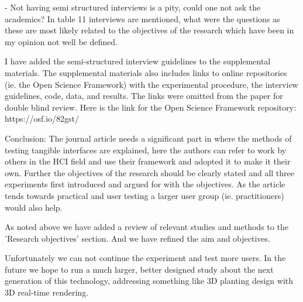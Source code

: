 - Not having semi structured interviews is a pity, could one not ask the academics? In table 11 interviews are mentioned, what were the questions as these are most likely related to the objectives of the research which have been in my opinion not well be defined.

I have added the semi-structured interview guidelines to the supplemental materials. The supplemental materials also includes links to online repositories (ie. the Open Science Framework) with the experimental procedure, the interview guidelines, code, data, and results. The links were omitted from the paper for double blind review. Here is the link for the Open Science Framework repository: https://osf.io/82gst/

Conclusion:
The journal article needs a significant part in where the methods of testing tangible interfaces are explained, here the authors can refer to work by others in the HCI field and use their framework and adopted it to make it their own. Further the objectives of the research should be clearly stated and all three experiments first introduced and argued for with the objectives. As the article tends towards practical and user testing a larger user group (ie. practitioners) would also help.

As noted above we have added a review of relevant studies and methods to the 'Research objectives' section. And we have refined the aim and objectives.

Unfortunately we can not continue the experiment and test more users. In the future we hope to run a much larger, better designed study about the next generation of this technology, addressing something like 3D planting design with 3D real-time rendering.
